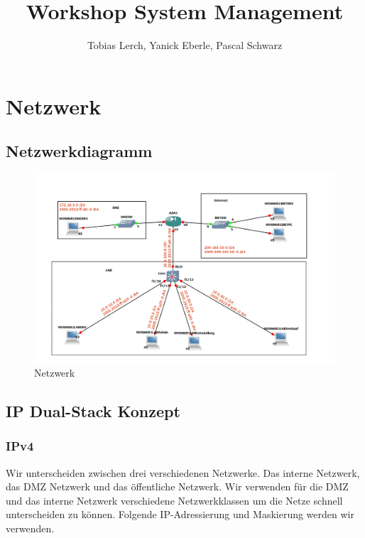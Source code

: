 \documentclass[11pt,a4paper,parskip=half]{scrartcl}
\title{Workshop System Management}
\author{Tobias Lerch, Yanick Eberle, Pascal Schwarz}
\begin{document}
\maketitle
\newpage

\tableofcontents
\newpage

\section{Netzwerk}
\subsection{Netzwerkdiagramm}
\begin{figure}[H]
\centering
\includegraphics[width=1.0\textwidth]{Phase1/Netz_IP.png}
\caption{Netzwerk}
\label{fig:netzwerkdiagramm}
\end{figure}

\subsection{IP Dual-Stack Konzept}
\subsubsection{IPv4}
Wir unterscheiden zwischen drei verschiedenen Netzwerke. Das interne Netzwerk, das DMZ Netzwerk und das öffentliche Netzwerk. Wir verwenden für die DMZ und das interne Netzwerk verschiedene Netzwerkklassen um die Netze schnell unterscheiden zu können. Folgende IP-Adressierung und Maskierung werden wir verwenden.
\end{document}
